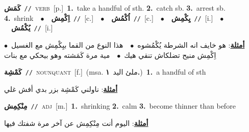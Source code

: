 \documentclass[10pt,a4paper,twoside]{article} %
\begin{document}
\begin{multicols}{2}
{\setlength\topsep{0pt}\textbf{\foreignlanguage{arabic}{كَمَش}}\ {\color{gray}\texttt{//}\color{black}}\ \textsc{verb}\ [p.]\ \textbf{1.}~take a handful of sth.  \textbf{2.}~catch sb.  \textbf{3.}~arrest sb.  \textbf{4.}~shrink\ \ $\bullet$\ \ \setlength\topsep{0pt}\textbf{\foreignlanguage{arabic}{اِكْمِش}}\ {\color{gray}\texttt{//}\color{black}}\ [c.]\ \ $\bullet$\ \ \setlength\topsep{0pt}\textbf{\foreignlanguage{arabic}{اُكْمُش}}\ {\color{gray}\texttt{//}\color{black}}\ [c.]\ \ $\bullet$\ \ \setlength\topsep{0pt}\textbf{\foreignlanguage{arabic}{يِكْمِش}}\ {\color{gray}\texttt{//}\color{black}}\ [i.]\ \ $\bullet$\ \ \setlength\topsep{0pt}\textbf{\foreignlanguage{arabic}{يُكْمُش}}\ {\color{gray}\texttt{//}\color{black}}\ [i.]\  \begin{flushright}\color{gray}\foreignlanguage{arabic}{\textbf{\underline{\foreignlanguage{arabic}{أمثلة}}}: هو خايف انه الشرطة يُكْمُشوه\ $\bullet$\ \  هذا النوع من القما بيِكْمِش مع الغسيل\ $\bullet$\ \  اِكْمِش منيح تضلكاش تنقي هيك\ $\bullet$\ \  مية مرة كَمَشته وهو بيحكي مع بنات}\end{flushright}\color{black}} \vspace{2mm}

{\setlength\topsep{0pt}\textbf{\foreignlanguage{arabic}{كَمْشِة}}\ {\color{gray}\texttt{//}\color{black}}\ \textsc{noun\textunderscore quant}\ [f.]\ \color{gray}(msa. \foreignlanguage{arabic}{ملئ اليد}~\foreignlanguage{arabic}{\textbf{١.}})\color{black}\ \textbf{1.}~a handful of sth\  \begin{flushright}\color{gray}\foreignlanguage{arabic}{\textbf{\underline{\foreignlanguage{arabic}{أمثلة}}}: ناولني كَمْشِة بزر بدي أفش غلي}\end{flushright}\color{black}} \vspace{2mm}

{\setlength\topsep{0pt}\textbf{\foreignlanguage{arabic}{مِنْكِمِش}}\ {\color{gray}\texttt{//}\color{black}}\ \textsc{adj}\ [m.]\ \textbf{1.}~shrinking  \textbf{2.}~calm  \textbf{3.}~become thinner than before\  \begin{flushright}\color{gray}\foreignlanguage{arabic}{\textbf{\underline{\foreignlanguage{arabic}{أمثلة}}}: اليوم أنت مِنْكِمِش عن آخر مرة شفتك فيها}\end{flushright}\color{black}} \vspace{2mm}


\end{multicols}
\end{document}
